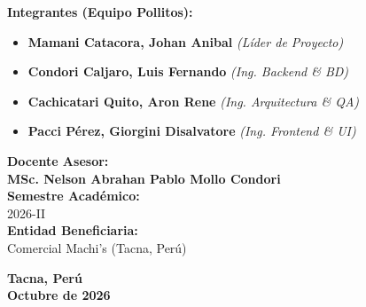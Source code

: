 \begin{titlepage}
\begin{center}
        \vspace{1.2cm}
        \begin{minipage}[t]{0.52\textwidth}
            {\large\bfseries\color{PrimaryBlue} Integrantes (Equipo Pollitos):}\\[0.25cm]
            \small
            \begin{itemize}[leftmargin=*,itemsep=3pt]
                \item \textbf{Mamani Catacora, Johan Anibal} \textit{(Líder de Proyecto)}
                \item \textbf{Condori Caljaro, Luis Fernando} \textit{(Ing. Backend \& BD)}
                \item \textbf{Cachicatari Quito, Aron Rene} \textit{(Ing. Arquitectura \& QA)}
                \item \textbf{Pacci Pérez, Giorgini Disalvatore} \textit{(Ing. Frontend \& UI)}
            \end{itemize}
        \end{minipage}
        \hfill
        \begin{minipage}[t]{0.42\textwidth}
            {\large\bfseries\color{PrimaryBlue} Docente Asesor:}\\[0.25cm]
            \small
            \textbf{MSc. Nelson Abrahan Pablo Mollo Condori}\\[0.4cm]
            {\large\bfseries\color{PrimaryBlue} Semestre Académico:}\\[0.15cm]
            \small 2026-II\\[0.3cm]
            {\large\bfseries\color{PrimaryBlue} Entidad Beneficiaria:}\\[0.15cm]
            \small Comercial Machi's (Tacna, Perú)
        \end{minipage}

        \vfill
        {\bfseries\color{DarkSlate} Tacna, Perú}\\[0.1cm]
        {\bfseries\color{SecondaryBlue} Octubre de 2026}
    \end{center}
\end{titlepage}
